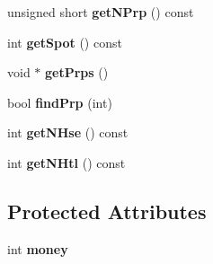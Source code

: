 \begin{DoxyCompactItemize}
\item 
\mbox{\label{class_player_a64e2d8ec271ba98488ad859a3aa03a92}} 
unsigned short {\bfseries get\+N\+Prp} () const
\item 
\mbox{\label{class_player_ab156853633779411ca1b4756645f0df4}} 
int {\bfseries get\+Spot} () const
\item 
\mbox{\label{class_player_afc6a4682a635e71ca8a388f91aa20d8e}} 
void $\ast$ {\bfseries get\+Prps} ()
\item 
\mbox{\label{class_player_ac7126430a8c67db6753a75f9699db78d}} 
bool {\bfseries find\+Prp} (int)
\item 
\mbox{\label{class_player_a4a7846d6d51a1006ecc2dba02405b340}} 
int {\bfseries get\+N\+Hse} () const
\item 
\mbox{\label{class_player_ab5dc0baad7fd17bcae42387fc1fdb764}} 
int {\bfseries get\+N\+Htl} () const
\end{DoxyCompactItemize}
\subsection*{Protected Attributes}
\begin{DoxyCompactItemize}
\item 
\mbox{\label{class_player_a9545beef70350d5c3b3a5719a890dd2f}} 
int {\bfseries money}
\end{DoxyCompactItemize}
